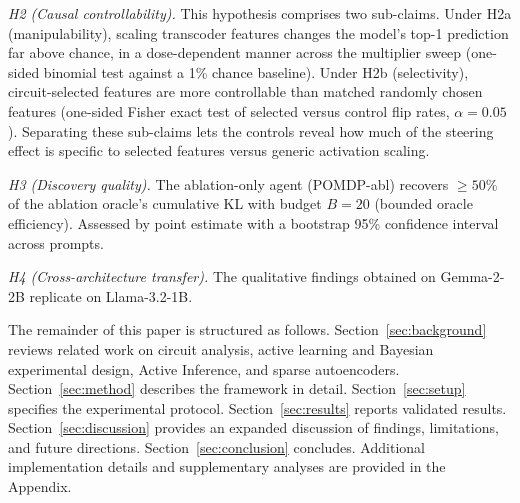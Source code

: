 \emph{H2 (Causal controllability).}  This hypothesis comprises two sub-claims.
Under H2a (manipulability), scaling transcoder features changes the
model's top-1 prediction far above chance, in a dose-dependent manner
across the multiplier sweep (one-sided binomial test against a 1\%
chance baseline). Under H2b (selectivity), circuit-selected features
are more controllable than matched randomly chosen features
(one-sided Fisher exact test of selected versus control flip rates,
$\alpha = 0.05$). Separating these sub-claims lets the controls reveal how
much of the steering effect is specific to selected features versus
generic activation scaling.

\emph{H3 (Discovery quality).}  The ablation-only agent (POMDP-abl) recovers
$\geq 50\%$ of the ablation oracle's cumulative KL with budget $B=20$
(bounded oracle efficiency). Assessed by point estimate with a bootstrap
95\% confidence interval across prompts.

\emph{H4 (Cross-architecture transfer).}  The qualitative findings
obtained on Gemma-2-2B replicate on Llama-3.2-1B.

The remainder of this paper is structured as follows. Section~\ref{sec:background}
reviews related work on circuit analysis, active learning and Bayesian
experimental design, Active Inference, and sparse autoencoders. Section~\ref{sec:method}
describes the \ACD{} framework in detail. Section~\ref{sec:setup} specifies the
experimental protocol. Section~\ref{sec:results} reports validated results. Section~\ref{sec:discussion}
provides an expanded discussion of findings, limitations, and future directions. Section~\ref{sec:conclusion}
concludes. Additional implementation details and supplementary analyses are provided
in the Appendix.
